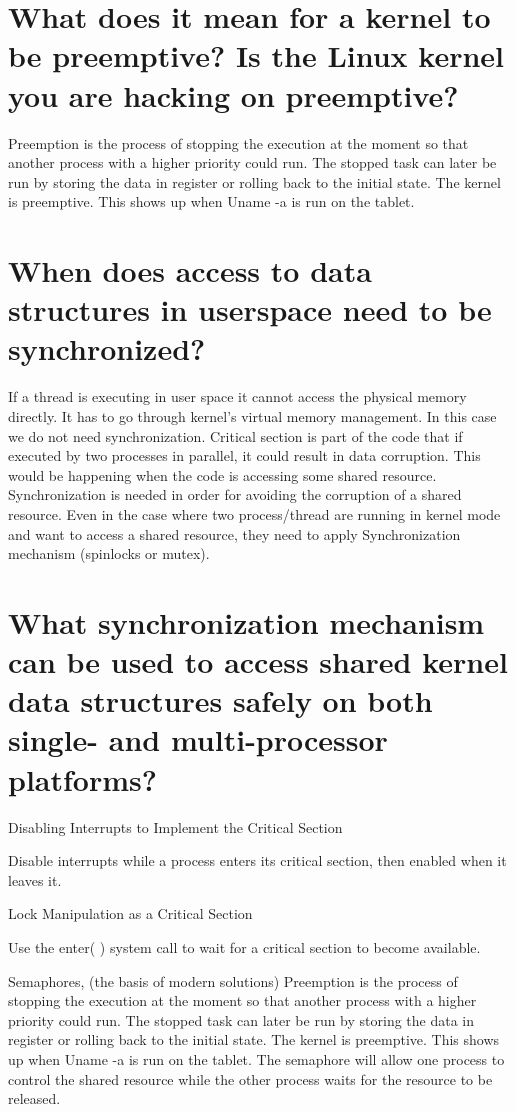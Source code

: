 \documentclass[letterpaper,10pt]{article}
\begin{document}
\section{What does it mean for a kernel to be preemptive? Is the Linux kernel you are hacking on preemptive?}

Preemption is the process of stopping the execution at the moment so that another process with a higher priority could run. The stopped task can later be run by storing the data in register or rolling back to the initial state. The kernel is preemptive. This shows up when Uname -a is run on the tablet. 

\section{When does access to data structures in userspace need to be synchronized?}

If a thread is executing in user space it cannot access the physical memory directly. It has to go through kernel's virtual memory management. In this case we do not need synchronization.
Critical section is part of the code that if executed by two processes in parallel, it could result in data corruption. This would be happening when the code is accessing some shared resource. Synchronization is needed in order for avoiding the corruption of a shared resource. Even in the case where two process/thread are running in kernel mode and want to access a shared resource, they need to apply Synchronization mechanism (spinlocks or mutex).

\section{What synchronization mechanism can be used to access shared kernel data structures safely on both single- and multi-processor platforms?}

Disabling Interrupts to Implement the Critical Section

Disable interrupts while a process enters its critical section, then enabled when it leaves it.

Lock Manipulation as a Critical Section 

Use the enter( ) system call to wait for a critical section to become available.

Semaphores, (the basis of modern solutions)
Preemption is the process of stopping the execution at the moment so that another process with a higher priority could run. The stopped task can later be run by storing the data in register or rolling back to the initial state. The kernel is preemptive. This shows up when Uname -a is run on the tablet. 
The semaphore will allow one process to control the shared resource while the other process waits for the resource to be released.
\end{document}
